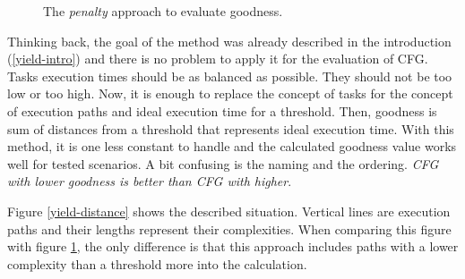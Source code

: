 \begin{figure}[h!]
\centering
\vspace{0.5cm}
\caption{The \emph{penalty} approach to evaluate goodness.}
\label{yield-penalty}
\end{figure}

Thinking back, the goal of the method was already described in the introduction (\ref{yield-intro}) and there is no problem to apply it for the evaluation of CFG. Tasks execution times should be as balanced as possible. They should not be too low or too high. Now, it is enough to replace the concept of tasks for the concept of execution paths and ideal execution time for a threshold. Then, goodness is sum of distances from a threshold that represents ideal execution time. With this method, it is one less constant to handle and the calculated goodness value works well for tested scenarios. A bit confusing is the naming and the ordering. \emph{CFG with lower goodness is better than CFG with higher}.

Figure \ref{yield-distance} shows the described situation. Vertical lines are execution paths and their lengths represent their complexities. When comparing this figure with figure \ref{yield-penalty}, the only difference is that this approach includes paths with a lower complexity than a threshold more into the calculation.

